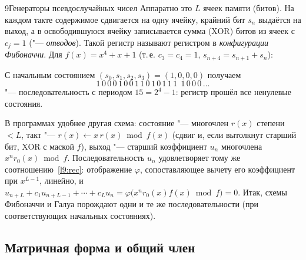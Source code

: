 \begin{lecture}{9}{Генераторы псевдослучайных чисел}
Аппаратно это $L$ ячеек памяти (битов). На каждом такте содержимое сдвигается на одну ячейку,
крайний бит $s_n$ выдаётся на выход, а в освободившуюся ячейку записывается сумма (XOR) битов
из ячеек с $c_j = 1$ ("--- \emph{отводов}). Такой регистр называют регистром в \emph{конфигурации
Фибоначчи}. Для $f(x) = x^4 + x + 1$ (т.\,е. $c_3 = c_4 = 1$, $s_{n+4} = s_{n+1} + s_n$):
\begin{center}
\end{center}
С начальным состоянием $(s_0, s_1, s_2, s_3) = (1, 0, 0, 0)$ получаем
\[
  1\,0\,0\,0\,1\,0\,0\,1\,1\,0\,1\,0\,1\,1\,1\ \ 1\,0\,0\,0\,\dots
\]
"--- последовательность с периодом $15 = 2^4 - 1$: регистр прошёл все ненулевые состояния.

\begin{remark}
В программах удобнее другая схема: состояние "--- многочлен $r(x)$ степени $< L$, такт "---
$r(x) \gets x\, r(x) \bmod f(x)$ (сдвиг и, если вытолкнут старший бит, XOR с маской $f$), выход "---
старший коэффициент $u_n$ многочлена $x^n r_0(x) \bmod f$. Последовательность $u_n$ удовлетворяет
тому же соотношению~\eqref{l9:rec}: отображение $\varphi$, сопоставляющее вычету его коэффициент
при $x^{L-1}$, линейно, и
$u_{n+L} + c_1 u_{n+L-1} + \cdots + c_L u_n = \varphi\bigl(x^n r_0(x) f(x) \bmod f\bigr) = 0$.
Итак, схемы Фибоначчи и Галуа порождают одни и те же последовательности (при соответствующих
начальных состояниях).
\end{remark}

\subsection{Матричная форма и общий член}


\end{lecture}
